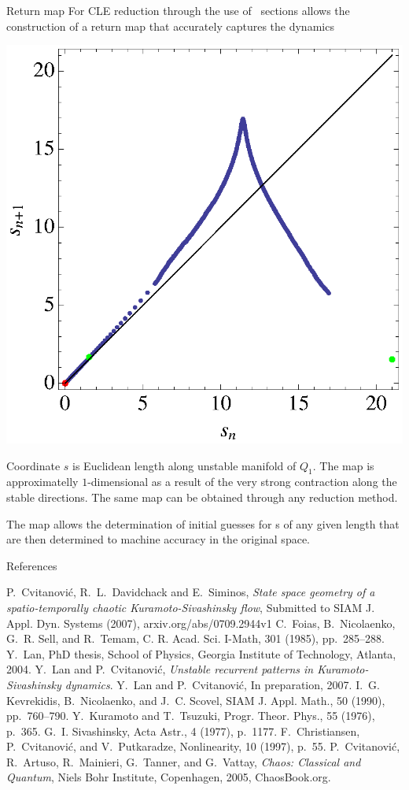 \documentclass{theo1poster}[2003/04/25]
\begin{document}
\begin{poster}{3}
\begin{sheet}{Return map}
 \large
 For CLE reduction through the use of \Poincare~sections allows the construction
 of a return map that accurately captures the dynamics
 \begin{center}
 	 	\includegraphics[width=.38\textwidth]{../../figs/CLEinvRM.eps}
 \end{center}
 Coordinate $s$ is Euclidean length along unstable manifold of \reqv
 $Q_1$. The map is approximatelly $1$-dimensional as a result of the very strong 
 contraction along the stable directions. The same map can be obtained through
 any reduction method.

 The map allows the determination of initial guesses for \rpo s of any given
 length that are then determined to machine accuracy in the original space.

 
 
 

 
\end{sheet}



\begin{sheet}{References}
\begin{thebibliography}{99}
	{\sc P.~Cvitanovi\'c, R.~L.~Davidchack and E.~Siminos},
	\emph{State space geometry of a spatio-temporally chaotic Kuramoto-Sivashinsky flow}, Submitted to
	SIAM J. Appl. Dyn. Systems (2007), arxiv.org/abs/0709.2944v1
{\sc C.~Foias, B.~Nicolaenko, G.~R. Sell, and R.~Temam}, C. R. Acad. Sci. I-Math, 301
  (1985), pp.~285--288.
{\sc Y.~Lan}, PhD thesis, School of Physics, Georgia Institute of
  Technology, Atlanta, 2004.
{\sc Y.~Lan and P.~Cvitanovi\'{c}}, {\em Unstable recurrent patterns in
  {K}uramoto-{S}ivashinsky dynamics}.
{\sc Y.~Lan and P.~Cvitanovi\'{c}}, 
\newblock In preparation, 2007.
{\sc I.~G. Kevrekidis, B.~Nicolaenko, and J.~C. Scovel},  SIAM J. Appl. Math., 50 (1990), pp.~760--790.
{\sc Y.~Kuramoto and T.~Tsuzuki},  Progr. Theor.
  Phys., 55 (1976), p.~365.
{\sc G.~I. Sivashinsky}, Acta Astr., 4
  (1977), p.~1177.
{\sc F.~Christiansen, P.~Cvitanovi\'{c}, and V.~Putkaradze}, Nonlinearity,
  10 (1997), p.~55.
{\sc P.~Cvitanovi\'{c}, R.~Artuso, R.~Mainieri, G.~Tanner, and G.~Vattay}, {\em
  Chaos: Classical and Quantum}, Niels Bohr Institute, Copenhagen, 2005,
  ChaosBook.org.
\end{thebibliography}
\end{sheet}



\end{poster}
\end{document}
